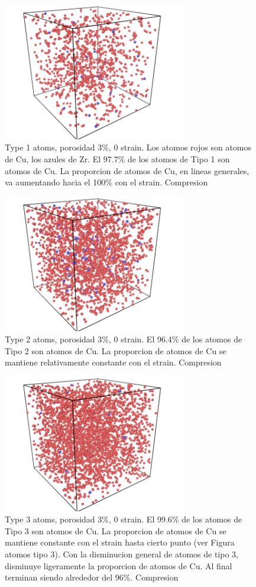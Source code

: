 \documentclass[10pt, oneside]{article} %
\begin{document}
\begin{figure}[H]
\centering
\includegraphics[width=8cm]{Figures/Porosidad_3_CU_tipo1.png}
\caption{Type 1 atoms, porosidad 3\%, 0 strain. Los atomos rojos son atomos de Cu, los azules de Zr. El 97.7\% de los atomos de Tipo 1 son atomos de Cu. La proporcion de atomos de Cu, en lineas generales, va aumentando hacia el 100\% con el strain. Compresion}
\end{figure}

\begin{figure}[H]
\centering
\includegraphics[width=8cm]{Figures/Porosidad_3_CU_tipo2.png}
\caption{Type 2 atoms, porosidad 3\%, 0 strain. El 96.4\% de los atomos de Tipo 2 son atomos de Cu. La proporcion de atomos de Cu se mantiene relativamente constante con el strain. Compresion}
\end{figure}

\begin{figure}[H]
\centering
\includegraphics[width=8cm]{Figures/Porosidad_3_CU_tipo3.png}
\caption{Type 3 atoms, porosidad 3\%, 0 strain. El 99.6\% de los atomos de Tipo 3 son atomos de Cu. La proporcion de atomos de Cu se mantiene constante con el strain hasta cierto punto (ver Figura atomos tipo 3). Con la disminucion general de atomos de tipo 3, disminuye ligeramente la proporcion de atomos de Cu. Al final terminan siendo alrededor del 96\%. Compresion}
\end{figure}
\end{document}
